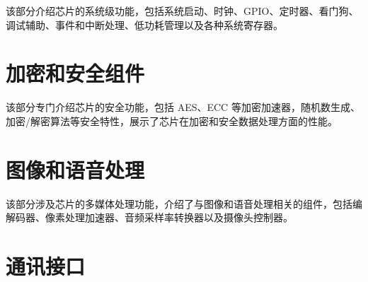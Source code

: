 \documentclass[openany, 10pt]{book}
\begin{document}
该部分介绍芯片的系统级功能，包括系统启动、时钟、GPIO、定时器、看门狗、调试辅助、事件和中断处理、低功耗管理以及各种系统寄存器。




\part{加密和安全组件}

该部分专门介绍芯片的安全功能，包括 AES、ECC 等加密加速器，随机数生成、加密/解密算法等安全特性，展示了芯片在加密和安全数据处理方面的性能。




\part{图像和语音处理}

该部分涉及芯片的多媒体处理功能，介绍了与图像和语音处理相关的组件，包括编解码器、像素处理加速器、音频采样率转换器以及摄像头控制器。


\part{通讯接口}

\end{document}

